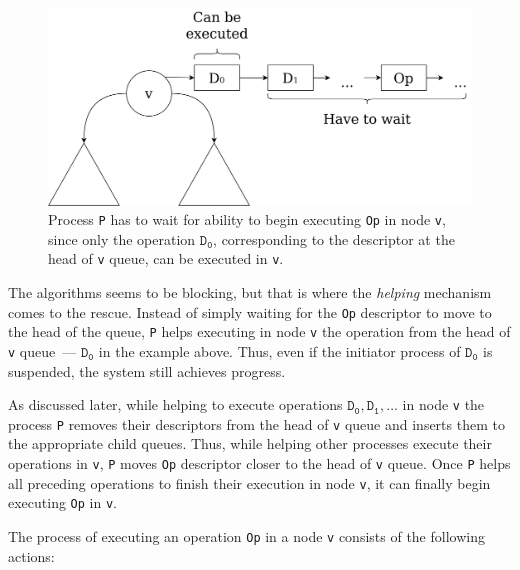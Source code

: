\documentclass[times, dvipsnames,%
               languages={russian,english} %
              ]{itmo-student-thesis}
\begin{document}
\begin{figure}[H]
  \centering
  \caption{Process \texttt{P} has to wait for ability to begin executing \texttt{Op} in node \texttt{v}, since only the operation $\texttt{D}_{\texttt{0}}$, corresponding to the descriptor at the head of \texttt{v} queue, can be executed in \texttt{v}.}
  \label{operation-execution-waiting-pic}
  \includegraphics[width=\linewidth]{pics/operation-execution-waiting.png}
\end{figure}

The algorithms seems to be blocking, but that is where the \emph{helping} mechanism comes to the rescue. Instead of simply waiting for the \texttt{Op} descriptor to move to the head of the queue, \texttt{P} helps executing in node \texttt{v} the operation from the head of \texttt{v} queue~--- $\texttt{D}_{\texttt{0}}$ in the example above. Thus, even if the initiator process of $\texttt{D}_{\texttt{0}}$ is suspended, the system still achieves progress. 

As discussed later, while helping to execute operations $\texttt{D}_{\texttt{0}}, \texttt{D}_{\texttt{1}}, \ldots$ in node \texttt{v} the process \texttt{P} removes their descriptors from the head of \texttt{v} queue and inserts them to the appropriate child queues. Thus, while helping other processes execute their operations in \texttt{v}, \texttt{P} moves \texttt{Op} descriptor closer to the head of \texttt{v} queue. Once \texttt{P} helps all preceding operations to finish their execution in node \texttt{v}, it can finally begin executing \texttt{Op} in \texttt{v}.

The process of executing an operation \texttt{Op} in a node \texttt{v} consists of the following actions:
\end{document}
